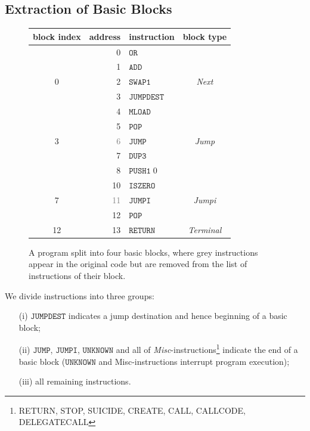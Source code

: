 \documentclass[sigplan,10pt,review]{acmart}\settopmatter{printfolios=true,printccs=false,printacmref=false}
\newcommand{\instr}[1]{\mathtt{#1}}
\begin{document}
\subsection{Extraction of Basic Blocks}
\label{sec:extract}
%
\begin{figure}[ht!]
\begin{tabular}{c | r l | c}
                block index & address & instruction & block type\\
                        \hline
                &       0       &       $\instr{OR}$&\\
                &       1       &       $\instr{ADD}$&\\
                {0}&    2       &       $\instr{SWAP1}$&  \textit{Next}\\
                        \hline
                &       3       &       $\instr{JUMPDEST}$&\\
                &       4       &       $\instr{MLOAD}$&\\
                &       5       &       $\instr{POP}$&\\
                {3}&    \textcolor{gray}{6}     &       {\color{gray}$\instr{JUMP}$}& \textit{Jump}\\
                        \hline
                &       7       &       $\instr{DUP3}$&\\
                &       8       &       $\instr{PUSH1}\;0$&\\
                &       10      &       $\instr{ISZERO}$&\\
                {7}&    \textcolor{gray}{11}    &       {\color{gray}$\instr{JUMPI}$}& \textit{Jumpi}\\
                        \hline
                &       12      &       $\instr{POP}$&\\
                {12}&   13      &       $\instr{RETURN}$& \textit{Terminal}\\
                        \hline
        \end{tabular}
\caption{A program split into four basic blocks, where grey instructions appear in the original
         code but are removed from the list of instructions of their block.}
\label{fig:basicblocks}
\end{figure}
We divide instructions into three groups:
\begin{itemize}
\item[(i)] $\instr{JUMPDEST}$ indicates a jump destination and hence beginning of a
                                 basic block;
\item[(ii)] $\instr{JUMP}$, $\instr{JUMPI}$, $\instr{UNKNOWN}$ and all of 
            \emph{Misc}-instructions\footnote{RETURN, STOP, SUICIDE, CREATE, CALL, CALLCODE, DELEGATECALL}
            indicate the end of a basic block ($\instr{UNKNOWN}$ and Misc-instructions interrupt program execution); 
\item[(iii)] all remaining instructions. %
\end{itemize}  
\end{document}
